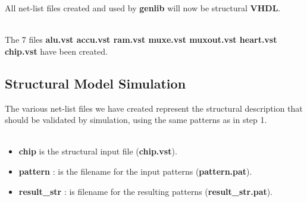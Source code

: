 \documentclass[11pt,a4]{article}
\begin{document}
All net-list files created and used by {\bf genlib} will now
be structural {\bf VHDL}.\\
\\

The 7 files {\bf alu.vst accu.vst ram.vst muxe.vst muxout.vst 
heart.vst chip.vst} have been created.

\subsection{Structural Model Simulation}

The various net-list files we have created represent the structural 
description that should be validated by simulation, using the same patterns as in step 1.\\
\\

\begin{itemize}
\item {\bf chip} is the structural input file ({\bf chip.vst}).
\item {\bf pattern} : is the filename for the input patterns ({\bf pattern.pat}).
\item {\bf result\_str} : is filename for the resulting patterns
({\bf result\_str.pat}).
\end{itemize}
\end{document}
